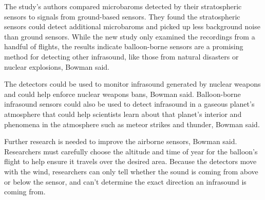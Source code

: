 \documentclass[10pt,a4paper]{article}
\begin{document}
The study's authors compared microbaroms detected by their stratospheric sensors to signals from ground-based sensors. They found the stratospheric sensors could detect additional microbaroms and picked up less background noise than ground sensors. While the new study only examined the recordings from a handful of flights, the results indicate balloon-borne sensors are a promising method for detecting other infrasound, like those from natural disasters or nuclear explosions, Bowman said.

The detectors could be used to monitor infrasound generated by nuclear weapons and could help enforce nuclear weapons bans, Bowman said. Balloon-borne infrasound sensors could also be used to detect infrasound in a gaseous planet's atmosphere that could help scientists learn about that planet's interior and phenomena in the atmosphere such as meteor strikes and thunder, Bowman said.

Further research is needed to improve the airborne sensors, Bowman said. Researchers must carefully choose the altitude and time of year for the balloon's flight to help ensure it travels over the desired area. Because the detectors move with the wind, researchers can only tell whether the sound is coming from above or below the sensor, and can't determine the exact direction an infrasound is coming from.
\end{document}
